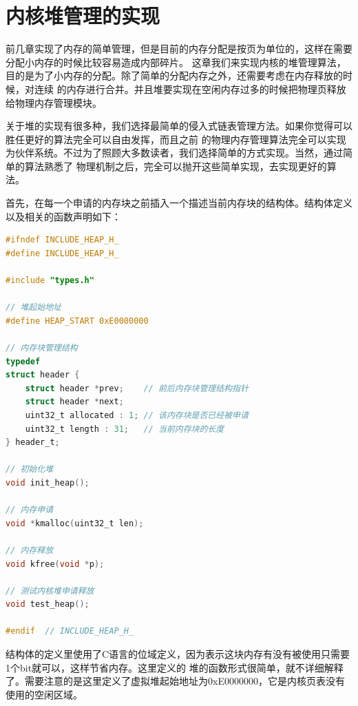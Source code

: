 
\section {内核堆管理的实现}

\par 前几章实现了内存的简单管理，但是目前的内存分配是按页为单位的，这样在需要分配小内存的时候比较容易造成内部碎片。\allowbreak
这章我们来实现内核的堆管理算法，目的是为了小内存的分配。除了简单的分配内存之外，还需要考虑在内存释放的时候，对连续\allowbreak
的内存进行合并。并且堆要实现在空闲内存过多的时候把物理页释放给物理内存管理模块。

\par 关于堆的实现有很多种，我们选择最简单的侵入式链表管理方法。如果你觉得可以胜任更好的算法完全可以自由发挥，而且之前\allowbreak
的物理内存管理算法完全可以实现为伙伴系统。不过为了照顾大多数读者，我们选择简单的方式实现。当然，通过简单的算法熟悉了\allowbreak
物理机制之后，完全可以抛开这些简单实现，去实现更好的算法。

\par 首先，在每一个申请的内存块之前插入一个描述当前内存块的结构体。结构体定义以及相关的函数声明如下：

\begin{lstlisting}[language = C, caption = include/heap.h]
#ifndef INCLUDE_HEAP_H_
#define INCLUDE_HEAP_H_

#include "types.h"

// 堆起始地址
#define HEAP_START 0xE0000000

// 内存块管理结构
typedef
struct header {
	struct header *prev; 	// 前后内存块管理结构指针
	struct header *next;
	uint32_t allocated : 1;	// 该内存块是否已经被申请
	uint32_t length : 31; 	// 当前内存块的长度
} header_t;

// 初始化堆
void init_heap();

// 内存申请
void *kmalloc(uint32_t len);

// 内存释放
void kfree(void *p);

// 测试内核堆申请释放
void test_heap();

#endif 	// INCLUDE_HEAP_H_
\end{lstlisting}

\par 结构体的定义里使用了C语言的位域定义，因为表示这块内存有没有被使用只需要1个bit就可以，这样节省内存。这里定义的\allowbreak
堆的函数形式很简单，就不详细解释了。需要注意的是这里定义了虚拟堆起始地址为0xE0000000，它是内核页表没有使用的空闲区域。


